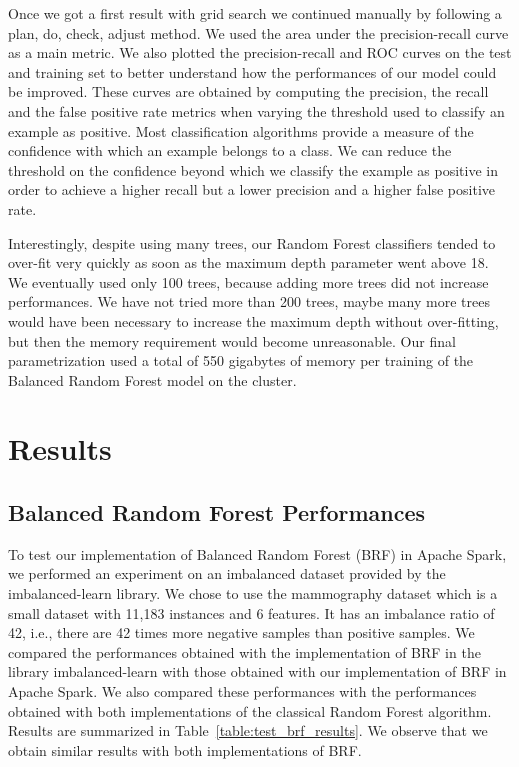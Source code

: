 \documentclass[conference]{IEEEtran}
\begin{document}
Once we got a first result with grid search we continued manually by
following a plan, do, check, adjust method. We used the area under the precision-recall curve as a main metric. We also plotted the precision-recall and ROC curves on the test and training set to better understand how the performances of our model could be improved. These curves are obtained by computing the precision, the recall and the false positive rate metrics when varying the threshold used to classify an example as positive. Most classification algorithms provide a measure of the confidence with which an example belongs to a class. We can reduce the threshold on the confidence beyond which we classify the example as positive in order to achieve a higher recall but a lower precision and a higher false positive rate.

Interestingly, despite using many trees, our Random Forest classifiers
tended to over-fit very quickly as soon as the maximum depth parameter went
above 18. We eventually used only 100 trees, because adding more trees did
not increase performances. We have not tried more than 200 trees, maybe
many more trees would have been necessary to increase the maximum depth
without over-fitting, but then the memory requirement would become unreasonable.
Our final parametrization used a total of 550 gigabytes of memory per training of the Balanced Random Forest model on the cluster.


\section{Results}
\label{sec:results}


\subsection{Balanced Random Forest Performances}

To test our implementation of Balanced Random Forest (BRF) in Apache Spark, we performed an experiment on an imbalanced dataset provided by the imbalanced-learn library.
We chose to use the mammography dataset\cite{Woods1993} which is a small dataset with 11,183 instances and 6 features. It has an imbalance ratio of 42, i.e., there are 42 times more negative samples than positive samples. We compared the performances obtained with the implementation of BRF in the library imbalanced-learn with those obtained with our implementation of BRF in Apache Spark. We also compared these performances with the performances obtained with both implementations of the classical Random Forest algorithm.
Results are summarized in Table~\ref{table:test_brf_results}. We observe that we obtain similar results with both implementations of BRF.
\end{document}
